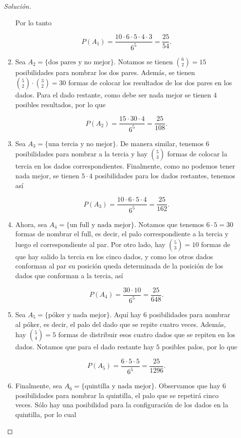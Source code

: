 \documentclass{article}
\renewcommand{\P}[1]{P\left(#1\right)}
\begin{document}
\begin{enumerate}
\begin{proof}[Solución]
\begin{enumerate}
    Por lo tanto 

    \[\P{A_1}=\frac{10\cdot 6\cdot 5\cdot 4\cdot 3}{6^5}=\frac{25}{54}.\]
    
    \item Sea $A_2=\{\text{dos pares y no mejor}\}$. Notamos se tienen $\binom{6}{2}=15$ posibilidades para nombrar los dos pares. Además, se tienen $\binom{5}{2}\cdot\binom{3}{2}=30$ formas de colocar los resultados de los dos pares en los dados. Para el dado restante, como debe ser nada mejor se tienen $4$ posibles resultados, por lo que 
    
    \[\P{A_2}=\frac{15\cdot 30\cdot 4}{6^5}=\frac{25}{108}.\]
    
    \item Sea $A_3=\{\text{una tercia y no mejor}\}$. De manera similar, tenemos $6$ posibilidades para nombrar a la tercia y hay $\binom{5}{3}$ formas de colocar la tercia en los dados correspondientes. Finalmente, como no podemos tener nada mejor, se tienen $5\cdot 4$ posibilidades para los dados restantes, tenemos así
    
    \[\P{A_3}=\frac{10\cdot 6\cdot 5\cdot 4}{6^5}=\frac{25}{162}.\]
    
    \item Ahora, sea $A_4=\{\text{un full y nada mejor}\}$. Notamos que tenemos $6\cdot 5=30$ formas de nombrar el full, es decir, el palo correspondiente a la tercia y luego el correspondiente al par. Por otro lado, hay $\binom{5}{3}=10$ formas de que hay salido la tercia en los cinco dados, y como los otros dados conforman al par su posición queda determinada de la posición de los dados que conforman a la tercia, así
    
    \[\P{A_4}=\frac{30\cdot 10}{6^5}=\frac{25}{648}.\]
    
    \item Sea $A_5=\{\text{póker y nada mejor}\}$. Aquí hay $6$ posibilidades para nombrar al póker, es decir, el palo del dado que se repite cuatro veces. Además, hay $\binom{5}{4}=5$ formas de distribuir esos cuatro dados que se repiten en los dados. Notamos que para el dado restante hay $5$ posibles palos, por lo que
    
    \[\P{A_5}=\frac{6\cdot 5\cdot 5}{6^5}=\frac{25}{1296}.\]
    
    \item Finalmente, sea $A_6=\{\text{quintilla y nada mejor}\}$. Observamos que hay $6$ posibilidades para nombrar la quintilla, el palo que se repetirá cinco veces. Sólo hay una posibilidad para la configuración de los dados en la quintilla, por lo cual
    

\end{enumerate}
\end{proof}
\end{enumerate}
\end{document}
